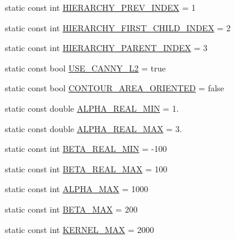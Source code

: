\begin{DoxyCompactItemize}
\item 
static const int \hyperlink{classmultiscale_1_1analysis_1_1RegionDetector_a61da49b4b696470dcb5daf2026920d64}{H\-I\-E\-R\-A\-R\-C\-H\-Y\-\_\-\-P\-R\-E\-V\-\_\-\-I\-N\-D\-E\-X} = 1
\item 
static const int \hyperlink{classmultiscale_1_1analysis_1_1RegionDetector_a306cb1a7eaef538ceb00eb0da7bd627c}{H\-I\-E\-R\-A\-R\-C\-H\-Y\-\_\-\-F\-I\-R\-S\-T\-\_\-\-C\-H\-I\-L\-D\-\_\-\-I\-N\-D\-E\-X} = 2
\item 
static const int \hyperlink{classmultiscale_1_1analysis_1_1RegionDetector_ad39f59ea52badbdf8c308c9553b9b666}{H\-I\-E\-R\-A\-R\-C\-H\-Y\-\_\-\-P\-A\-R\-E\-N\-T\-\_\-\-I\-N\-D\-E\-X} = 3
\item 
static const bool \hyperlink{classmultiscale_1_1analysis_1_1RegionDetector_a6a8c4f7b9a6bc40ec6de940f53943772}{U\-S\-E\-\_\-\-C\-A\-N\-N\-Y\-\_\-\-L2} = true
\item 
static const bool \hyperlink{classmultiscale_1_1analysis_1_1RegionDetector_ab1fdebf0daaae6f2bb1fe4770479116f}{C\-O\-N\-T\-O\-U\-R\-\_\-\-A\-R\-E\-A\-\_\-\-O\-R\-I\-E\-N\-T\-E\-D} = false
\item 
static const double \hyperlink{classmultiscale_1_1analysis_1_1RegionDetector_a4a11aa86a5250ca6197589c4ccb770f6}{A\-L\-P\-H\-A\-\_\-\-R\-E\-A\-L\-\_\-\-M\-I\-N} = 1.
\item 
static const double \hyperlink{classmultiscale_1_1analysis_1_1RegionDetector_abc853d2cfef9e4fafbf86715b48495e0}{A\-L\-P\-H\-A\-\_\-\-R\-E\-A\-L\-\_\-\-M\-A\-X} = 3.
\item 
static const int \hyperlink{classmultiscale_1_1analysis_1_1RegionDetector_a87d07b8a993b50bcf050e4c206ac126c}{B\-E\-T\-A\-\_\-\-R\-E\-A\-L\-\_\-\-M\-I\-N} = -\/100
\item 
static const int \hyperlink{classmultiscale_1_1analysis_1_1RegionDetector_a19e9e6c3ea18fe9a3dbf7a1a02652985}{B\-E\-T\-A\-\_\-\-R\-E\-A\-L\-\_\-\-M\-A\-X} = 100
\item 
static const int \hyperlink{classmultiscale_1_1analysis_1_1RegionDetector_a7ca1e136dc9d768f1e11cd6f770d950f}{A\-L\-P\-H\-A\-\_\-\-M\-A\-X} = 1000
\item 
static const int \hyperlink{classmultiscale_1_1analysis_1_1RegionDetector_ad2c6485f637cae5abee0303b41df1480}{B\-E\-T\-A\-\_\-\-M\-A\-X} = 200
\item 
static const int \hyperlink{classmultiscale_1_1analysis_1_1RegionDetector_aa988e3458f774c489e03e3f8bd0db1ed}{K\-E\-R\-N\-E\-L\-\_\-\-M\-A\-X} = 2000
\item 

\end{DoxyCompactItemize}
